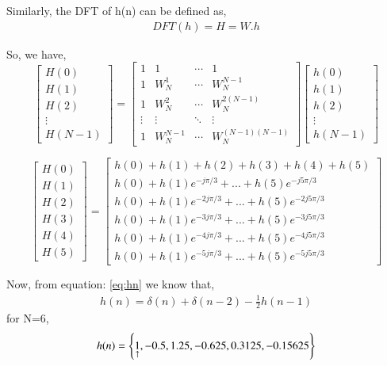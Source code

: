 \documentclass[journal,12pt,twocolumn]{IEEEtran}
\renewcommand\thesection{\arabic{section}}
\begin{document}
\begin{enumerate}[label=\thesection.\arabic*.,ref=\thesection.\theenumi]
Similarly, the DFT of h(n) can be defined as,
\begin{align}
    DFT(h)= H = W.h  \label{eq:dfth}
\end{align}

So, we have,
\begin{equation}
 \begin{bmatrix} H(0) \\ H(1) \\ H(2) \\ \vdots \\ H(N-1) \end{bmatrix}
=
\begin{bmatrix}
1 & 1 & \cdots & 1 \\
1 & W_N^1& \cdots & W_N^{N-1}\\
1 & W_N^2 &\cdots & W_N^{2(N-1)}\\
\vdots & \vdots & \ddots & \vdots\\
1 & W_N^{N-1} & \cdots &W_N^{(N-1)(N-1)}
\end{bmatrix}
\begin{bmatrix}
h(0) \\ h(1) \\ h(2) \\ \vdots \\ h(N-1)
\end{bmatrix}
\end{equation}

\begin{equation}
\begin{bmatrix} H(0) \\ H(1) \\ H(2) \\ H(3) \\ H(4) \\ H(5) \end{bmatrix}
=
\begin{bmatrix}
h(0) + h(1) + h(2) + h(3) + h(4) + h(5) \\h(0) + h(1)e^{-j\pi /3} + ... + h(5)e^{-j5\pi /3}\\h(0) + h(1)e^{-2j\pi /3} + ... + h(5)e^{-2j5\pi /3}\\h(0) + h(1)e^{-3j\pi /3} + ... + h(5)e^{-3j5\pi /3}\\
h(0) + h(1)e^{-4j\pi /3} + ... + h(5)e^{-4j5\pi /3}\\h(0) + h(1)e^{-5j\pi /3} + ... + h(5)e^{-5j5\pi /3}
\end{bmatrix}
\end{equation}
\bigskip

Now, from equation: \eqref{eq:hn} we know that,
\begin{align}
     h(n) = \delta(n) + \delta(n-2) - \frac{1}{2}h(n-1) 
\end{align}
for N=6,
\begin{align}
     h(n) = \left\{\underset{\uparrow}{1},-0.5,1.25,-0.625,0.3125,-0.15625\right\} 
\end{align}


\end{enumerate}
\end{document}
